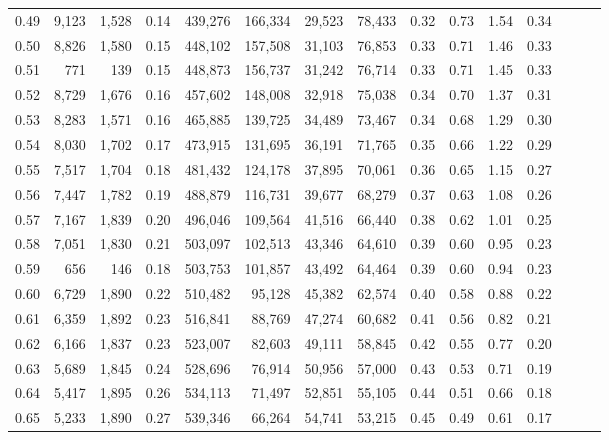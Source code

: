 \begin{tabular}{rrrrrrrrrrrrrrr}
0.49 &   9,123 &  1,528 &  0.14 &  439,276 &  166,334 &   29,523 &   78,433 &  0.32 &  0.73 &  1.54 &      0.34 \\
0.50 &   8,826 &  1,580 &  0.15 &  448,102 &  157,508 &   31,103 &   76,853 &  0.33 &  0.71 &  1.46 &      0.33 \\
0.51 &     771 &    139 &  0.15 &  448,873 &  156,737 &   31,242 &   76,714 &  0.33 &  0.71 &  1.45 &      0.33 \\
0.52 &   8,729 &  1,676 &  0.16 &  457,602 &  148,008 &   32,918 &   75,038 &  0.34 &  0.70 &  1.37 &      0.31 \\
0.53 &   8,283 &  1,571 &  0.16 &  465,885 &  139,725 &   34,489 &   73,467 &  0.34 &  0.68 &  1.29 &      0.30 \\
0.54 &   8,030 &  1,702 &  0.17 &  473,915 &  131,695 &   36,191 &   71,765 &  0.35 &  0.66 &  1.22 &      0.29 \\
0.55 &   7,517 &  1,704 &  0.18 &  481,432 &  124,178 &   37,895 &   70,061 &  0.36 &  0.65 &  1.15 &      0.27 \\
0.56 &   7,447 &  1,782 &  0.19 &  488,879 &  116,731 &   39,677 &   68,279 &  0.37 &  0.63 &  1.08 &      0.26 \\
0.57 &   7,167 &  1,839 &  0.20 &  496,046 &  109,564 &   41,516 &   66,440 &  0.38 &  0.62 &  1.01 &      0.25 \\
0.58 &   7,051 &  1,830 &  0.21 &  503,097 &  102,513 &   43,346 &   64,610 &  0.39 &  0.60 &  0.95 &      0.23 \\
0.59 &     656 &    146 &  0.18 &  503,753 &  101,857 &   43,492 &   64,464 &  0.39 &  0.60 &  0.94 &      0.23 \\
0.60 &   6,729 &  1,890 &  0.22 &  510,482 &   95,128 &   45,382 &   62,574 &  0.40 &  0.58 &  0.88 &      0.22 \\
0.61 &   6,359 &  1,892 &  0.23 &  516,841 &   88,769 &   47,274 &   60,682 &  0.41 &  0.56 &  0.82 &      0.21 \\
0.62 &   6,166 &  1,837 &  0.23 &  523,007 &   82,603 &   49,111 &   58,845 &  0.42 &  0.55 &  0.77 &      0.20 \\
0.63 &   5,689 &  1,845 &  0.24 &  528,696 &   76,914 &   50,956 &   57,000 &  0.43 &  0.53 &  0.71 &      0.19 \\
0.64 &   5,417 &  1,895 &  0.26 &  534,113 &   71,497 &   52,851 &   55,105 &  0.44 &  0.51 &  0.66 &      0.18 \\
0.65 &   5,233 &  1,890 &  0.27 &  539,346 &   66,264 &   54,741 &   53,215 &  0.45 &  0.49 &  0.61 &      0.17 \\

\end{tabular}
